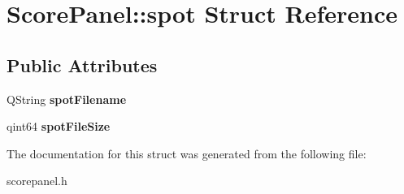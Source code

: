 \hypertarget{structScorePanel_1_1spot}{}\section{Score\+Panel\+:\+:spot Struct Reference}
\label{structScorePanel_1_1spot}
\subsection*{Public Attributes}
\begin{DoxyCompactItemize}
\item 
\mbox{\label{structScorePanel_1_1spot_a4e803bd26e1ab84d38504a73f57f73d6}} 
Q\+String {\bfseries spot\+Filename}
\item 
\mbox{\label{structScorePanel_1_1spot_acdc268ef33dcc49ccd4cc9b90f2bc9bc}} 
qint64 {\bfseries spot\+File\+Size}
\end{DoxyCompactItemize}


The documentation for this struct was generated from the following file\+:\begin{DoxyCompactItemize}
\item 
scorepanel.\+h\end{DoxyCompactItemize}
